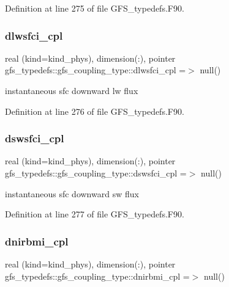 Definition at line 275 of file G\+F\+S\+\_\+typedefs.\+F90.

\mbox{\label{structgfs__typedefs_1_1gfs__coupling__type_a76e8eae43f114412ad203f38c5a9d67a}} 
\subsubsection{dlwsfci\+\_\+cpl}
{\footnotesize\ttfamily real (kind=kind\+\_\+phys), dimension(\+:), pointer gfs\+\_\+typedefs\+::gfs\+\_\+coupling\+\_\+type\+::dlwsfci\+\_\+cpl =$>$ null()}



instantaneous sfc downward lw flux 



Definition at line 276 of file G\+F\+S\+\_\+typedefs.\+F90.

\mbox{\label{structgfs__typedefs_1_1gfs__coupling__type_a54a6abdb5d98a659120f7c5f4d6c1ee7}} 
\subsubsection{dswsfci\+\_\+cpl}
{\footnotesize\ttfamily real (kind=kind\+\_\+phys), dimension(\+:), pointer gfs\+\_\+typedefs\+::gfs\+\_\+coupling\+\_\+type\+::dswsfci\+\_\+cpl =$>$ null()}



instantaneous sfc downward sw flux 



Definition at line 277 of file G\+F\+S\+\_\+typedefs.\+F90.

\mbox{\label{structgfs__typedefs_1_1gfs__coupling__type_a4107ba26597cf4bf9353c377a8d2f4ee}} 
\subsubsection{dnirbmi\+\_\+cpl}
{\footnotesize\ttfamily real (kind=kind\+\_\+phys), dimension(\+:), pointer gfs\+\_\+typedefs\+::gfs\+\_\+coupling\+\_\+type\+::dnirbmi\+\_\+cpl =$>$ null()}



